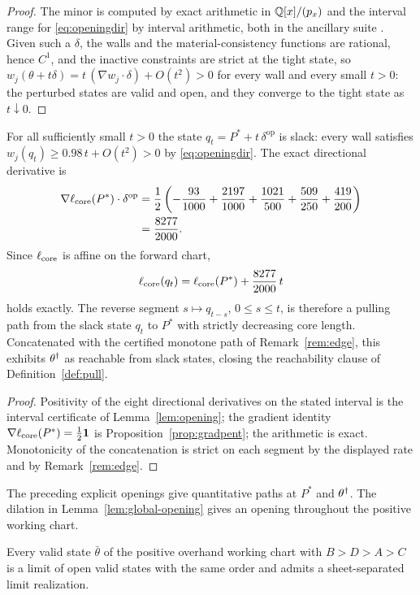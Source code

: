 \begin{proof}
The minor is computed by exact arithmetic in $\mathbb{Q}[x]/(p_x)$ and the interval range for \eqref{eq:openingdir} by interval arithmetic, both in the ancillary suite \cite{anc}. Given such a $\delta$, the walls and the material-consistency functions are rational, hence $C^1$, and the inactive constraints are strict at the tight state, so $w_j(\theta+t\delta)=t\,(\nabla w_j\cdot\delta)+O(t^2)>0$ for every wall and every small $t>0$: the perturbed states are valid and open, and they converge to the tight state as $t\downarrow0$.
\end{proof}

\begin{corollary}\label{cor:slackstart}
For all sufficiently small $t>0$ the state $q_t=P^*+t\,\delta^{\mathrm{op}}$ is slack: every wall satisfies $w_j(q_t)\ge0.98\,t+O(t^2)>0$ by \eqref{eq:openingdir}. The exact directional derivative is
\[
\begin{aligned}
\nabla\ell_{\mathrm{core}}(P^*)\cdot\delta^{\mathrm{op}}
 &=\frac12\left(-\frac{93}{1000}+\frac{2197}{1000}
                  +\frac{1021}{500}+\frac{509}{250}+\frac{419}{200}\right)\\
 &=\frac{8277}{2000}.
\end{aligned}
\]
Since $\ell_{\mathrm{core}}$ is affine on the forward chart,
\[
\ell_{\mathrm{core}}(q_t)=\ell_{\mathrm{core}}(P^*)+\frac{8277}{2000}\,t
\]
holds exactly. The reverse segment $s\mapsto q_{t-s}$, $0\le s\le t$, is therefore a pulling path from the slack state $q_t$ to $P^*$ with strictly decreasing core length. Concatenated with the certified monotone path of Remark~\ref{rem:edge}, this exhibits $\theta^\dagger$ as reachable from slack states, closing the reachability clause of Definition~\ref{def:pull}.
\end{corollary}
\begin{proof}
Positivity of the eight directional derivatives on the stated interval is the interval certificate of Lemma~\ref{lem:opening}; the gradient identity $\nabla\ell_{\mathrm{core}}(P^*)=\tfrac12\mathbf 1$ is Proposition~\ref{prop:gradpent}; the arithmetic is exact. Monotonicity of the concatenation is strict on each segment by the displayed rate and by Remark~\ref{rem:edge}.
\end{proof}

The preceding explicit openings give quantitative paths at $P^*$ and $\theta^\dagger$. The dilation in Lemma~\ref{lem:global-opening} gives an opening throughout the positive working chart.

\begin{theorem}\label{thm:limitreal}
Every valid state $\bar\theta$ of the positive overhand working chart with $B>D>A>C$ is a limit of open valid states with the same order and admits a sheet-separated limit realization.
\end{theorem}

